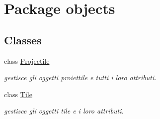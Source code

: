\hypertarget{namespaceobjects}{}\section{Package objects}
\label{namespaceobjects}
\subsection*{Classes}
\begin{DoxyCompactItemize}
\item 
class \hyperlink{classobjects_1_1_projectile}{Projectile}
\begin{DoxyCompactList}\small\item\em gestisce gli oggetti proiettile e tutti i loro attributi. \end{DoxyCompactList}\item 
class \hyperlink{classobjects_1_1_tile}{Tile}
\begin{DoxyCompactList}\small\item\em gestisce gli oggetti tile e i loro attributi. \end{DoxyCompactList}\end{DoxyCompactItemize}
